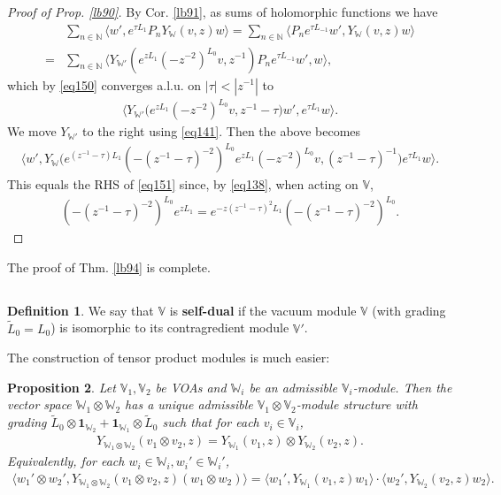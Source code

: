 \documentclass[11pt,b5paper,notitlepage]{article}
\theoremstyle{definition}
\newtheorem{df}{Definition}[section]
\theoremstyle{plain}
\newtheorem{pp}[df]{Proposition}
\newcommand{\wtd}{\widetilde}
\newcommand{\id}{\mathbf{1}}
\newcommand{\bk}[1]{\langle {#1}\rangle}
\newcommand{\bigbk}[1]{\big\langle {#1}\big\rangle}
\newcommand{\Vbb}{\mathbb V}
\newcommand{\Wbb}{\mathbb W}
\newcommand{\Nbb}{\mathbb N}
\numberwithin{equation}{section}
\begin{document}
\begin{proof}[Proof of Prop. \ref{lb90}]
By Cor. \ref{lb91}, as sums of holomorphic functions we have
\begin{align*}
&\sum_{n\in\Nbb}\bigbk{w',e^{\tau L_1}P_nY_\Wbb(v,z)w}=\sum_{n\in\Nbb}\bigbk{P_ne^{\tau L_{-1}}w',Y_\Wbb(v,z)w}\\
=&\sum_{n\in\Nbb}\bigbk{Y_{\Wbb'}(e^{zL_1}(-z^{-2})^{L_0}v,z^{-1})P_ne^{\tau L_{-1}}w',w},
\end{align*}
which by \eqref{eq150} converges a.l.u. on $|\tau|<|z^{-1}|$ to
\begin{align*}
\bigbk{Y_{\Wbb'}\big(e^{zL_1}(-z^{-2})^{L_0}v,z^{-1}-\tau\big)w',e^{\tau L_1}w}.
\end{align*}
We move $Y_{\Wbb'}$ to the right using \eqref{eq141}. Then the above becomes
\begin{align*}
\bigbk{w',Y_\Wbb\big(e^{(z^{-1}-\tau)L_1}(-(z^{-1}-\tau)^{-2})^{L_0}e^{zL_1}(-z^{-2})^{L_0}v,(z^{-1}-\tau)^{-1}\big)e^{\tau L_1}w}.
\end{align*}
This equals the RHS of \eqref{eq151} since, by \eqref{eq138}, when acting on $\Vbb$,
\begin{align*}
(-(z^{-1}-\tau)^{-2})^{L_0}e^{zL_1}=e^{-z(z^{-1}-\tau)^2L_1}	(-(z^{-1}-\tau)^{-2})^{L_0}.
\end{align*}
\end{proof}

The proof of Thm. \ref{lb94} is complete.

\subsection{}






\begin{df}
	We say that $\Vbb$ is \textbf{self-dual}  if the vacuum module $\Vbb$ (with grading $\wtd L_0=L_0$) is isomorphic to its contragredient module $\Vbb'$.
\end{df}


The construction of tensor product modules is much easier:

\begin{pp}
Let $\Vbb_1,\Vbb_2$ be VOAs and $\Wbb_i$ be an admissible $\Vbb_i$-module. Then the vector space $\Wbb_1\otimes\Wbb_2$ has a unique admissible $\Vbb_1\otimes\Vbb_2$-module structure with grading $\wtd L_0\otimes\id_{\Wbb_2}+\id_{\Wbb_1}\otimes \wtd L_0$ such that for each $v_i\in\Vbb_i$,
\begin{align}
Y_{\Wbb_1\otimes\Wbb_2}(v_1\otimes v_2,z)=Y_{\Wbb_1}(v_1,z)\otimes Y_{\Wbb_2}(v_2,z).	
\end{align}
Equivalently, for each $w_i\in \Wbb_i,w_i'\in\Wbb_i'$,
\begin{align}
\bigbk{w_1'\otimes w_2',Y_{\Wbb_1\otimes\Wbb_2}(v_1\otimes v_2,z)(w_1\otimes w_2)}=\bk{w_1',Y_{\Wbb_1}(v_1,z)w_1}\cdot \bk{w_2',Y_{\Wbb_2}(v_2,z)w_2}.	\label{eq152}
\end{align}
\end{pp}
\end{document}
